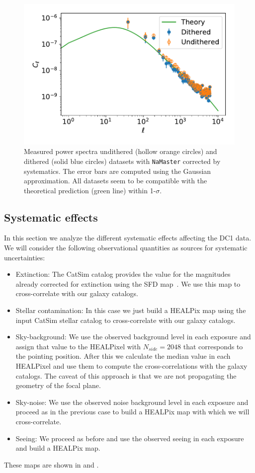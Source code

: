 \documentclass[\docopts]{\docclass}
\begin{document}
\begin{figure}
\centering
\includegraphics[width=0.9\columnwidth]{Cl_25p3_errors}
\caption{Measured power spectra undithered (hollow orange circles) and dithered (solid blue circles) datasets with \texttt{NaMaster} corrected by systematics. The error bars are computed using the Gaussian approximation. All datasets seem to be compatible with the theoretical prediction (green line) within 1-$\sigma$.}
\label{fig:power_spectra}
\end{figure}
\subsection{Systematic effects}
In this section we analyze the different systematic effects affecting the DC1 data. We will consider the following observational quantities as sources for systematic uncertainties:
\begin{itemize}
\item Extinction: The CatSim catalog provides the value for the magnitudes already corrected for extinction using the SFD map~\citep{1998ApJ...500..525S}. We use this map to cross-correlate with our galaxy catalogs.
\item Stellar contamination: In this case we just build a HEALPix map using the input CatSim stellar catalog to cross-correlate with our galaxy catalogs.
\item Sky-background: We use the observed background level in each exposure and assign that value to the HEALPixel with $N_{side}=2048$ that corresponds to the pointing position. After this we calculate the median value in each HEALPixel and use them to compute the cross-correlations with the galaxy catalogs. The caveat of this approach is that we are not propagating the geometry of the focal plane.
\item Sky-noise: We use the observed noise background level in each exposure and proceed as in the previous case to build a HEALPix map with which we will cross-correlate.
\item Seeing: We proceed as before and use the observed seeing in each exposure and build a HEALPix map.
\end{itemize}
These maps are shown in  and . 
\end{document}
